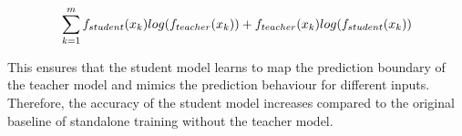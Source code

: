 \begin{equation}
\footnotesize
\sum_{k=1}^m f_{student}(x_k)log(f_{teacher}(x_k)) + f_{teacher}(x_k)log(f_{student}(x_k))
\end{equation}


This ensures that the student model learns to map the prediction boundary of the teacher model and mimics the prediction behaviour for different inputs. %
Therefore, the accuracy of the student model increases compared to the original baseline of standalone training without the teacher model. %
